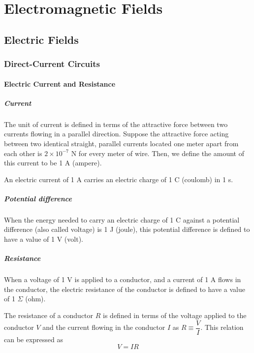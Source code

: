 \part{Electromagnetic Fields}
\chapter{Electric Fields}
\section{Direct-Current Circuits}
\subsection{Electric Current and Resistance}
\subsubsection{Current}
The unit of current is defined in terms of the attractive force between two currents flowing in a parallel direction. Suppose the attractive force acting between two identical straight, parallel currents located one meter apart from each other is $2 \times 10^{-7}$ N for every meter of wire. Then, we define the amount of this current to be 1 A (ampere). 

An electric current of 1 A carries an electric charge of 1 C (coulomb) in 1 s. 

\subsubsection{Potential difference}
When the energy needed to carry an electric charge of 1 C against a potential difference (also called voltage) is 1 J (joule), this potential difference is defined to have a value of 1 V (volt).

\subsubsection{Resistance}
 When a voltage of 1 V is applied to a conductor, and a current
of 1 A flows in the conductor, the electric resistance of the conductor is defined to have a value of 1 $\Sigma$ (ohm).

The resistance of a conductor $R$ is defined in terms of the voltage applied to the conductor $V$ and the current flowing in the conductor $I$ as $R \equiv \dfrac{V}{I}$. This relation can be expressed as
\begin{equation}
{V=IR
}\end{equation}

